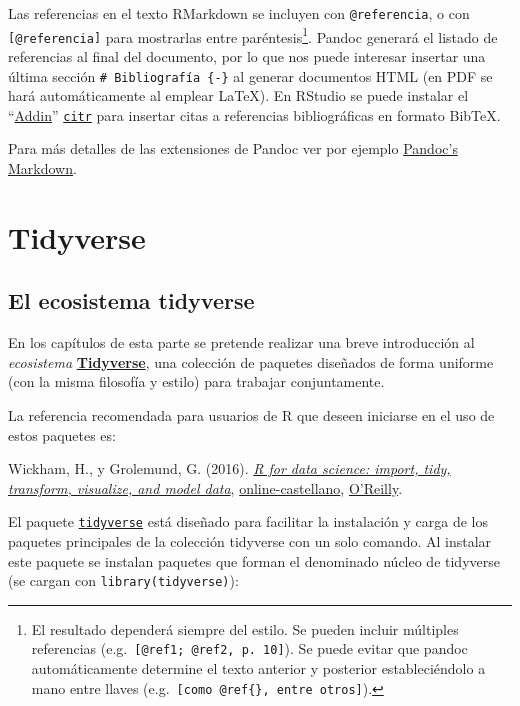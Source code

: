 \documentclass[
]{book}
\theoremstyle{break}
\theoremstyle{nonumberplain}
\let\oldfootnote\footnote
\renewcommand\footnote[1]{\oldfootnote{\hspace{2mm}#1}}
\begin{document}
Las referencias en el texto RMarkdown se incluyen con \texttt{@referencia}, o con \texttt{{[}@referencia{]}} para mostrarlas entre paréntesis\footnote{El resultado dependerá siempre del estilo.
  Se pueden incluir múltiples referencias (e.g.~\texttt{{[}@ref1;\ @ref2,\ p.\ 10{]}}).
  Se puede evitar que pandoc automáticamente determine el texto anterior y posterior estableciéndolo a mano entre llaves (e.g.~\texttt{{[}como\ @ref\{\},\ entre\ otros{]}}).}.
Pandoc generará el listado de referencias al final del documento,
por lo que nos puede interesar insertar una última sección \texttt{\#\ Bibliografía\ \{-\}}
al generar documentos HTML (en PDF se hará automáticamente al emplear LaTeX).
En RStudio se puede instalar el ``\href{https://rstudio.github.io/rstudioaddins/}{Addin}''
\href{https://github.com/crsh/citr}{\texttt{citr}} para insertar
citas a referencias bibliográficas en formato BibTeX.

Para más detalles de las extensiones de Pandoc ver por ejemplo \href{https://pandoc.org/MANUAL.html\#pandocs-markdown}{Pandoc's Markdown}.

\part{Tidyverse}\label{part-tidyverse}

\chapter{El ecosistema tidyverse}\label{tidyverse}

En los capítulos de esta parte se pretende realizar una breve introducción al \emph{ecosistema} \href{https://dplyr.tidyverse.org}{\textbf{Tidyverse}}, una colección de paquetes diseñados de forma uniforme (con la misma filosofía y estilo) para trabajar conjuntamente.

La referencia recomendada para usuarios de R que deseen iniciarse en el uso de estos paquetes es:

Wickham, H., y Grolemund, G. (2016). \emph{\href{http://r4ds.had.co.nz}{R for data science: import, tidy, transform, visualize, and model data}}, \href{https://es.r4ds.hadley.nz}{online-castellano}, \href{http://shop.oreilly.com/product/0636920034407.do}{O'Reilly}.

El paquete \href{https://tidyverse.tidyverse.org}{\texttt{tidyverse}} está diseñado para facilitar la instalación y carga de los paquetes principales de la colección tidyverse con un solo comando.
Al instalar este paquete se instalan paquetes que forman el denominado núcleo de tidyverse (se cargan con \texttt{library(tidyverse)}):
\end{document}
